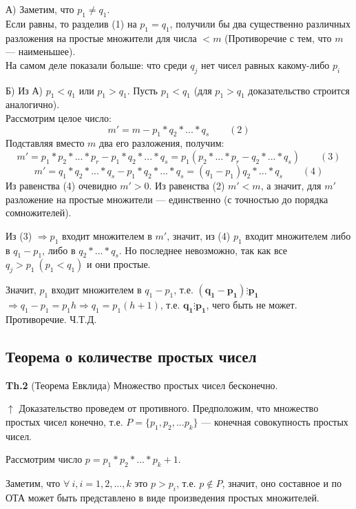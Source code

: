 \documentclass{article}
\begin{document}
            А) Заметим, что \( p_1 \neq q_1 \).\\
            Если равны, то разделив (1) на \( p_1 = q_1 \), получили бы два существенно различных разложения на простые множители для числа \( < m \) (Противоречие с тем, что \( m \) --- наименьшее).\\
            На самом деле показали больше: что среди \( q_j \) нет чисел равных какому-либо \( p_i \)

            Б) Из А) \( p_1 < q_1 \) или \( p_1 > q_1 \). Пусть \( p_1 < q_1 \) (для \( p_1 > q_1 \) доказательство строится аналогично).\\
            Рассмотрим целое число: \[ m' = m - p_1*q_2*...*q_s\qquad (2) \]
            Подставляя вместо \( m \) два его разложения, получим: \[ m' = p_1*p_2*...*p_r - p_1*q_2*...*q_s = p_1(p_2*...*p_r - q_2*...*q_s)\qquad (3) \] \[ m' = q_1*q_2*...*q_s - p_1*q_2*...*q_s = (q_1 - p_1)q_2*...*q_s\qquad (4) \]
            Из равенства (4) очевидно \( m' > 0 \). Из равенства (2) \( m' < m \), а значит, для \( m' \) разложение на простые множители --- единственно (с точностью до порядка сомножителей).

            Из (3) \( \Rightarrow p_1 \) входит множителем в \( m' \), значит, из (4) \( p_1 \) входит множителем либо в \( q_1 - p_1 \), либо в \( q_2*...*q_s \). Но последнее невозможно, так как все \( q_j > p_1\ (p_1 < q_1) \) и они простые.

            Значит, \( p_1 \) входит множителем в \( q_1 - p_1 \), т.е. \( \mathbf{(q_1 - p_1) \vdots p_1} \) \( \Rightarrow q_1 - p_1 = p_1h \Rightarrow q_1 = p_1(h + 1) \), т.е. \( \mathbf{q_1 \vdots p_1} \), чего быть не может. Противоречие. Ч.Т.Д.
            
        \subsection{Теорема о количестве простых чисел}
            \textbf{Th.2} (Теорема Евклида) Множество простых чисел бесконечно.

            \( \uparrow \) Доказательство проведем от противного. Предположим, что множество простых чисел конечно, т.е. \( P=\{p_1,p_2,...p_k\} \) --- конечная совокупность простых чисел.

            Рассмотрим число \( p = p_1*p_2*...*p_k + 1 \).

            Заметим, что \( \forall\ i, i=1,2,...,k \) это \( p > p_i \), т.е. \( p \notin P \), значит, оно составное и по ОТА может быть представлено в виде произведения простых множителей.
\end{document}

